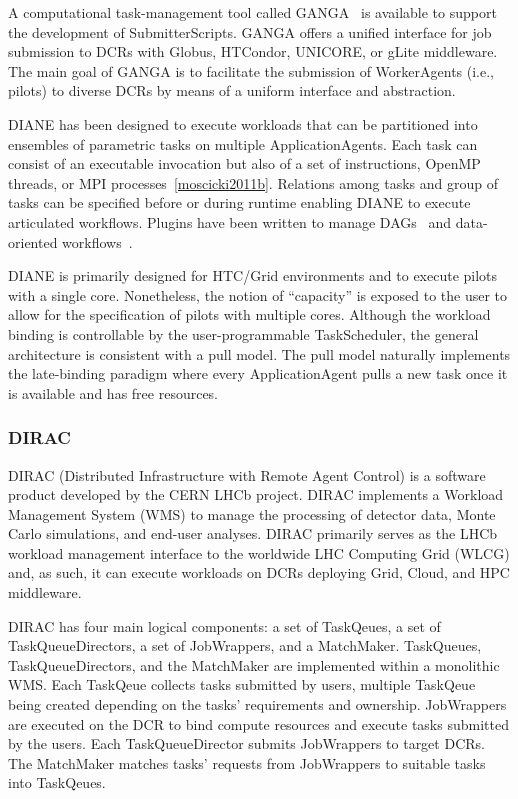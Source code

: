 \documentclass{sig-alternate}
\begin{document}
A computational task-management tool called
GANGA~\cite{moscicki2009ganga,ganga_url} is available to support the development
of SubmitterScripts. GANGA offers a unified interface for job submission to DCRs
with Globus, HTCondor, UNICORE, or gLite middleware. The main goal of GANGA is
to facilitate the submission of WorkerAgents (i.e., pilots) to diverse DCRs by
means of a uniform interface and abstraction.

DIANE has been designed to execute workloads that can be partitioned into
ensembles of parametric tasks on multiple ApplicationAgents. Each task can
consist of an executable invocation but also of a set of instructions, OpenMP
threads, or MPI processes~\ref{moscicki2011b}. Relations among tasks and group
of tasks can be specified before or during runtime enabling DIANE to execute
articulated workflows. Plugins have been written to manage
DAGs~\cite{grzeslo2009} and data-oriented workflows~\cite{glatard2008}.

DIANE is primarily designed for HTC/Grid environments and to execute pilots with
a single core. Nonetheless, the notion of ``capacity'' is exposed to the user to
allow for the specification of pilots with multiple cores. Although the workload
binding is controllable by the user-programmable TaskScheduler, the general
architecture is consistent with a pull model. The pull model naturally
implements the late-binding paradigm where every ApplicationAgent pulls a new
task once it is available and has free resources.

%
\subsubsection{DIRAC}\label{sec:dirac}

DIRAC (Distributed Infrastructure with Remote Agent Control) is a software
product developed by the CERN LHCb project\cite{tsaregorodtsev2004dirac}. DIRAC
implements a Workload Management System (WMS) to manage the processing of
detector data, Monte Carlo simulations, and end-user analyses. DIRAC primarily
serves as the LHCb workload management interface to the worldwide LHC Computing
Grid (WLCG) and, as such, it can execute workloads on DCRs deploying Grid,
Cloud, and HPC middleware.

DIRAC has four main logical components: a set of TaskQeues, a set of
TaskQueueDirectors, a set of JobWrappers, and a MatchMaker. TaskQueues,
TaskQueueDirectors, and the MatchMaker are implemented within a monolithic WMS.
Each TaskQeue collects tasks submitted by users, multiple TaskQeue being created
depending on the tasks' requirements and ownership. JobWrappers are executed on
the DCR to bind compute resources and execute tasks submitted by the users. Each
TaskQueueDirector submits JobWrappers to target DCRs. The MatchMaker matches
tasks' requests from JobWrappers to suitable tasks into TaskQeues.
\end{document}
